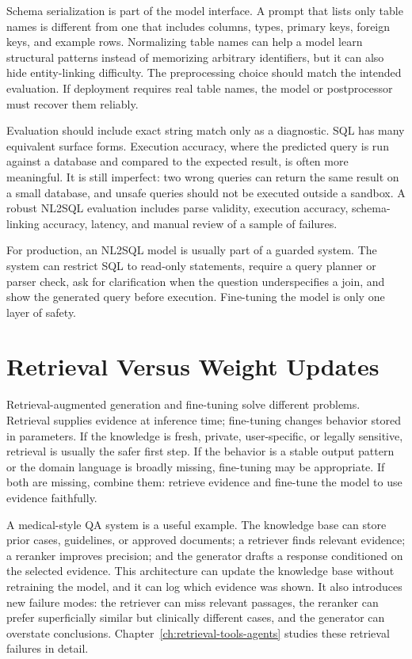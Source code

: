 Schema serialization is part of the model interface. A prompt that lists only table names is different from one that includes columns, types, primary keys, foreign keys, and example rows. Normalizing table names can help a model learn structural patterns instead of memorizing arbitrary identifiers, but it can also hide entity-linking difficulty. The preprocessing choice should match the intended evaluation. If deployment requires real table names, the model or postprocessor must recover them reliably.

Evaluation should include exact string match only as a diagnostic. SQL has many equivalent surface forms. Execution accuracy, where the predicted query is run against a database and compared to the expected result, is often more meaningful. It is still imperfect: two wrong queries can return the same result on a small database, and unsafe queries should not be executed outside a sandbox. A robust NL2SQL evaluation includes parse validity, execution accuracy, schema-linking accuracy, latency, and manual review of a sample of failures.

For production, an NL2SQL model is usually part of a guarded system. The system can restrict SQL to read-only statements, require a query planner or parser check, ask for clarification when the question underspecifies a join, and show the generated query before execution. Fine-tuning the model is only one layer of safety.

\section{Retrieval Versus Weight Updates}
\label{sec:retrieval-versus-updates}

Retrieval-augmented generation and fine-tuning solve different problems. Retrieval supplies evidence at inference time; fine-tuning changes behavior stored in parameters. If the knowledge is fresh, private, user-specific, or legally sensitive, retrieval is usually the safer first step. If the behavior is a stable output pattern or the domain language is broadly missing, fine-tuning may be appropriate. If both are missing, combine them: retrieve evidence and fine-tune the model to use evidence faithfully.

A medical-style QA system is a useful example. The knowledge base can store prior cases, guidelines, or approved documents; a retriever finds relevant evidence; a reranker improves precision; and the generator drafts a response conditioned on the selected evidence. This architecture can update the knowledge base without retraining the model, and it can log which evidence was shown. It also introduces new failure modes: the retriever can miss relevant passages, the reranker can prefer superficially similar but clinically different cases, and the generator can overstate conclusions. Chapter~\ref{ch:retrieval-tools-agents} studies these retrieval failures in detail.


